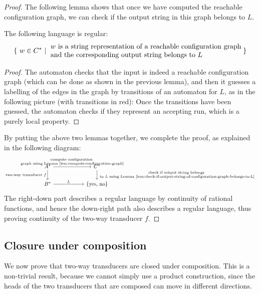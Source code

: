 \begin{proof}
    The following lemma shows that once we have computed the reachable configuration graph, we can check if the output string in this graph belongs to $L$.

    \begin{lemma}\label{lem:check-if-output-string-of-configuration-graph-belongs-to-L}
        The following language is regular:
        \begin{align*}
        \setbuild{ w \in C^*}{$w$ is a string representation of a reachable configuration graph \\ and the corresponding output string belongs to $L$}
        \end{align*}
    \end{lemma}
    \begin{proof}
        The automaton checks that the input is indeed a reachable configuration graph (which can be done as shown in the previous lemma), and then it guesses a labelling of the edges in the graph by transitions of an automaton for $L$, as in the following picture (with transitions in red):
        Once the transitions have been guessed, the automaton checks if they represent an accepting run, which is a purely local property.
    \end{proof}

    By putting the above two lemmas together, we complete the proof, as explained in the following diagram: 
    \[
    \begin{tikzcd}[column sep=2cm]
    A^* \ar[r,"{\scriptsize\shortstack[c]{\text{compute configuration }\\[-2pt]\text{graph using Lemma~\ref{lem:compute-configuration-graph}}}}"]
    \ar[d,"\text{two-way transducer $f$}"'] & C^*
    \ar[d,"{\scriptsize\shortstack[c]{\text{check if output string belongs}\\[-2pt]\text{ to \emph{L} using Lemma~\ref{lem:check-if-output-string-of-configuration-graph-belongs-to-L}}}}"] \\
    B^* \ar[r, "L"] & \set{\text{yes, no}}
    \end{tikzcd}
    \]
    The right-down part describes a regular language by continuity of rational functions, and hence the down-right path also describes a regular language, thus proving continuity of the two-way transducer $f$.
\end{proof}


\subsection{Closure under composition}
We now prove that two-way transducers are closed under composition. This is a non-trivial result, because we cannot simply use a product construction, since the heads of the two transducers that are composed can move in different directions. 

